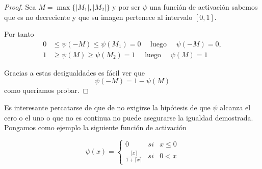 \begin{proof}
Sea $M = \max \{|M_1|,|M_2|\}$ y por ser $\psi$ una función de activación sabemos que
es no decreciente y que su imagen pertenece al intervalo $[0,1].$

Por tanto
\begin{align}
      0 &\leq \psi(-M) \leq \psi(M_1) = 0 \quad \text{ luego } \quad \psi(-M) = 0, \\
      1 &\geq \psi(M) \geq \psi(M_2) = 1 \quad \text{ luego } \quad\psi(M) = 1
\end{align}

Gracias a estas desigualdades es fácil ver que 
\begin{equation}
    \psi(-M) = 1 - \psi(M)
\end{equation}
como queríamos probar. 
\end{proof}   

Es interesante percatarse de que de no exigirse la hipótesis de 
que $\psi$ alcanza el cero o el uno o que no es continua no puede 
asegurarse la igualdad demostrada. Pongamos como ejemplo la siguiente función de activación

\begin{equation}
    \psi(x)= \left\{ \begin{array}{lcc}
        0 &   si  & x \leq 0 \\
        \frac{\lceil x \rceil}{1+ \lceil x \rceil}&  si & 0< x  
        \end{array}
    \right. 
\end{equation}